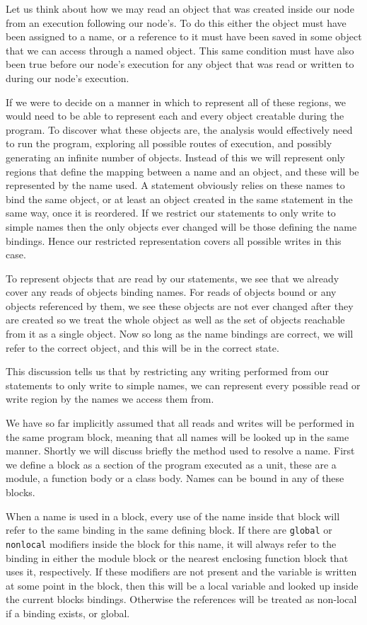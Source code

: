 \documentclass[twoside,a4paper]{report}
\begin{document}
Let us think about how we may read an object that was created inside our node from an execution following our node's. To do this either the object must have
been assigned to a name, or a reference to it must have been saved in some object that we can access through a named object. This same condition must have also
been true before our node's execution for any object that was read or written to during our node's execution.

If we were to decide on a manner in which to represent all of these regions, we would need to be able to represent each and every object creatable during the
program. To discover what these objects are, the analysis would effectively need to run the program, exploring all possible routes of execution, and possibly
generating an infinite number of objects. Instead of this we will represent only regions that define the mapping between a name and an object, and these will be
represented by the name used.
\pagebreak
A statement obviously relies on these names to bind the same object, or at least an object created in the same statement in the same way, once it is reordered.
If we restrict our statements to only write to simple names then the only objects ever changed will be those defining the name bindings. Hence our restricted
representation covers all possible writes in this case.

To represent objects that are read by our statements, we see that we already cover any reads of objects binding names. For reads of objects bound or any objects
referenced by them, we see these objects are not ever changed after they are created so we treat the whole object as well as the set of objects reachable from
it as a single object. Now so long as the name bindings are correct, we will refer to the correct object, and this will be in the correct state.

This discussion tells us that by restricting any writing performed from our statements to only write to simple names, we can represent every possible read or
write region by the names we access them from.

We have so far implicitly assumed that all reads and writes will be performed in the same program block, meaning that all names will be looked up in the same
manner. Shortly we will discuss briefly the method used to resolve a name. First we define a block as a section of the program executed as a unit, these are a
module, a function body or a class body. Names can be bound in any of these blocks.

When a name is used in a block, every use of the name inside that block will refer to the same binding in the same defining block. If there are \texttt{global} or
\texttt{nonlocal} modifiers inside the block for this name, it will always refer to the binding in either the module block or the nearest enclosing
function block that uses it, respectively. If these modifiers are not present and the variable is written at some point in the block, then this will
be a local variable and looked up inside the current blocks bindings. Otherwise the references will be treated as non-local if a binding exists, or global.
\end{document}
